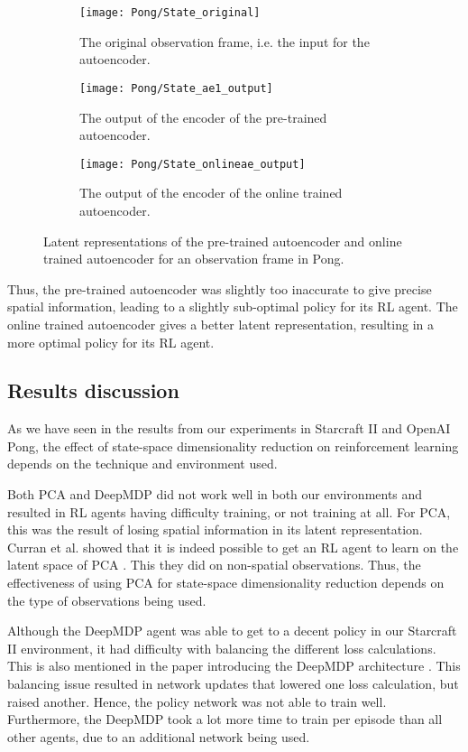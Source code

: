 \begin{figure}[h]
	\centering
	\begin{subfigure}[b]{0.45\textwidth}
		\texttt{[image: Pong/State\_original]}
		\caption{The original observation frame, i.e. the input for the autoencoder.}
	\end{subfigure}\hfill
	\begin{subfigure}[b]{0.45\textwidth}
		\texttt{[image: Pong/State\_ae1\_output]}
		\caption{The output of the encoder of the pre-trained autoencoder.}
	\end{subfigure}\medskip
	\begin{subfigure}[b]{0.45\textwidth}
		\texttt{[image: Pong/State\_onlineae\_output]}
		\caption{The output of the encoder of the online trained autoencoder.}
	\end{subfigure}
	\caption{Latent representations of the pre-trained autoencoder and online trained autoencoder for an observation frame in Pong.}
	\label{fig:online-ae-output-pong}
\end{figure}

Thus, the pre-trained autoencoder was slightly too inaccurate to give precise spatial information, leading to a slightly sub-optimal policy for its RL agent. The online trained autoencoder gives a better latent representation, resulting in a more optimal policy for its RL agent.

\clearpage
\subsection{Results discussion}\label{research-discussion}
As we have seen in the results from our experiments in Starcraft II and OpenAI Pong, the effect of state-space dimensionality reduction on reinforcement learning depends on the technique and environment used. 

Both PCA and DeepMDP did not work well in both our environments and resulted in RL agents having difficulty training, or not training at all. For PCA, this was the result of losing spatial information in its latent representation. Curran et al. showed that it is indeed possible to get an RL agent to learn on the latent space of PCA \cite{mario}. This they did on non-spatial observations. Thus, the effectiveness of using PCA for state-space dimensionality reduction depends on the type of observations being used.

Although the DeepMDP agent was able to get to a decent policy in our Starcraft II environment, it had difficulty with balancing the different loss calculations. This is also mentioned in the paper introducing the DeepMDP architecture \cite{deepmdp}. This balancing issue resulted in network updates that lowered one loss calculation, but raised another. Hence, the policy network was not able to train well. Furthermore, the DeepMDP took a lot more time to train per episode than all other agents, due to an additional network being used.

